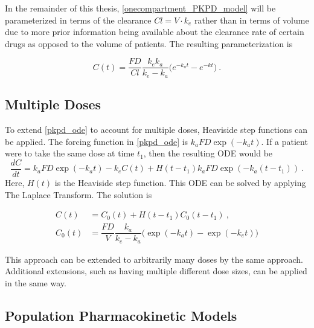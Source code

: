 In the remainder of this thesis, \cref{onecompartment_PKPD_model} will be parameterized in terms of the clearance  $\mathit{Cl} = V \cdot k_e$ rather than in terms of volume due to more prior information being available about the clearance rate of certain drugs as opposed to the volume of patients.  The resulting parameterization is

\begin{equation}\label{onecompartment_PKPD_cl}
	C(t) = \dfrac{F D}{\mathit{Cl}}\dfrac{k_ek_a}{k_e - k_a}\Big(e^{-k_at} - e^{-kt}\Big) \>.
\end{equation}


\subsection{Multiple Doses}

To extend \cref{pkpd_ode} to account for multiple doses, Heaviside step functions can be applied.  The forcing function in \cref{pkpd_ode} is $ k_aFD\exp(-k_a t)$.  If a patient were to take the same dose at time $t_1$, then the resulting ODE would be
\begin{equation}  \label{pkpd_ode_2_doses}
	\dfrac{dC}{dt} = k_aFD\exp(-k_a t) - k_eC(t) + H(t-t_1)k_aFD\exp(-k_a (t-t_1)) \>.
\end{equation}
\noindent Here, $H(t)$ is the Heaviside step function.  This ODE can be solved by applying The Laplace Transform.  The solution is 

\begin{align*}
	C(t) &=  C_0(t) + H(t-t_1)C_0(t-t_1) \>, \\
	C_0(t) &= \dfrac{F D}{V}\dfrac{k_a}{k_e - k_a}\Big(\exp(-k_at) - \exp(-k_et)\Big)
\end{align*}

\noindent  This approach can be extended to arbitrarily many doses by the same approach.  Additional extensions, such as having multiple different dose sizes, can be applied in the same way.


\subsection{Population Pharmacokinetic Models}


